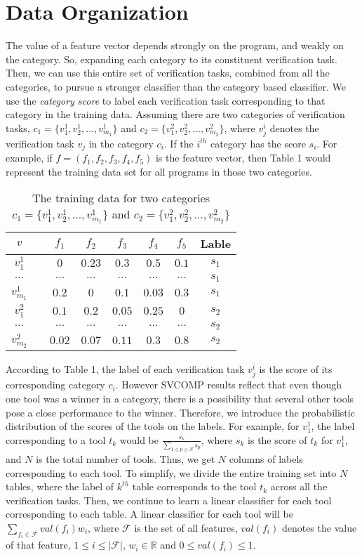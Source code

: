 \section{Data Organization}
\label{data}
The value of a feature vector depends strongly on the program, and weakly on the category. So, expanding each category to its constituent verification task. Then, we can use this entire set of verification tasks, combined from all the categories, to pursue a stronger classifier than the category based classifier. We use the \emph{category score} to label each verification task corresponding to that category in the training data. Assuming there are two categories of verification tasks, $c_1=\{v^1_1, v^1_2, ..., v^1_{m_1}\}$ and $c_2=\{v^2_1, v^2_2, ..., v^2_{m_2}\}$, where $v^i_j$ denotes the verification task $v_j$ in the category $c_i$. If the $i^{th}$ category has the score $s_i$. For example, if $f=(f_1, f_2, f_3, f_4, f_5)$ is the feature vector, then Table 1 would represent the training data set for all programs in those two categories. 
\begin{table}
\label{tbl:training_data}
\centering
\begin{tabular}{ccc|c|c|c|c||c}
$v$ & & $f_1$ & $f_2$ &  $f_3$ & $f_4$ & $f_5$ & Lable \\
\hline
$v^1_1$ & & $0$ & $0.23$ &  $0.3$ & $0.5$ & $0.1$ & $s_1$ \\
$\dots$ & & $\dots$ & $\dots$ &  $\dots$ & $\dots$ & $\dots$ & $s_1$ \\
$v^1_{m_1}$ & & $0.2$ & $0$ &  $0.1$ & $0.03$ & $0.3$ & $s_1$ \\
$v^2_{1}$ & & $0.1$ & $0.2$ &  $0.05$ & $0.25$ & $0$ & $s_2$ \\
$\dots$ & & $\dots$ & $\dots$ &  $\dots$ & $\dots$ & $\dots$ & $s_2$ \\
$v^2_{m_2}$ & & $0.02$ & $0.07$ &  $0.11$ & $0.3$ & $0.8$ & $s_2$ \\
\end{tabular}
\caption{The training data for two categories $c_1=\{v^1_1, v^1_2, ..., v^1_{m_1}\}$ and $c_2=\{v^2_1, v^2_2, ..., v^2_{m_2}\}$}
\end{table}
According to Table 1, the label of each verification task $v^i_j$ is the score of its corresponding category $c_i$. However SVCOMP results reflect that even though one tool was a winner in a category, there is a possibility that several other tools pose a close performance to the winner. Therefore, we introduce the probabilistic distribution of the scores of the tools on the labels. For example, for $v^1_1$, the label corresponding to a tool $t_k$ would be $\frac{s_k}{\sum \limits_{1 \leq p \leq N} s_p}$, where $s_k$ is the score of $t_k$ for $v^1_1$, and $N$ is the total number of tools. Thus, we get $N$ columns of labels corresponding to each tool. To simplify, we divide the entire training set into $N$ tables, where the label of $k^{th}$ table corresponds to the tool $t_k$ across all the verification tasks. Then, we continue to learn a linear classifier for each tool corresponding to each table. A linear classifier for each tool will be $\sum \limits_{f_i \in \mathcal{F}} val(f_i)w_i$, where $\mathcal{F}$ is the set of all features, $val(f_i)$ denotes the value of that feature, $1 \leq i \leq |\mathcal{F}|$, $w_i \in \mathbb{R}$ and $0 \leq val(f_i) \leq 1$.